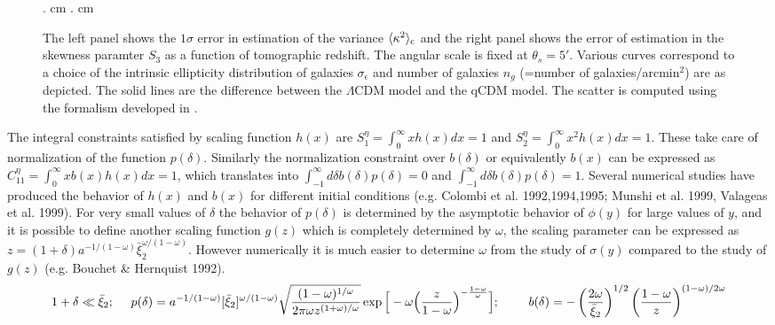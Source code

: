 \documentclass[usenatbib]{mn2e}
\def\la{\langle}
\def\ra{\rangle}
\begin{document}
\begin{figure}
\begin{center}
{. cm . cm
{}}
\end{center}
\caption{The left panel shows the $1\sigma$ error in estimation of the variance $\la\kappa^2\ra_{\rm c}$ and
the right panel shows the error of estimation in the skewness paramter $S_3$ as a function of tomographic redshift.  The angular scale
is fixed at $\theta_s=5'$. Various curves correspond to a choice of
the intrinsic ellipticity distribution of galaxies $\sigma_{\epsilon}$ 
and number of galaxies $n_{g}$ (=number of galaxies/arcmin$^2$) are as depicted. The solid lines are the difference between the $\Lambda$CDM model and the
qCDM model. The scatter is computed using the formalism developed in \citep{VaMuBa05}.}
\label{fig:sn_err}
\end{figure}
The integral constraints satisfied by scaling function $h(x)$ are
$ S^{\eta}_1 = \int_0^{\infty} x h(x) dx = 1$ and 
$ S^{\eta}_2 = \int_0^{\infty} x^2 h
(x) dx = 1$. These take care of  
normalization of the function $p(\delta)$. Similarly the 
normalization constraint over $b(\delta)$ or equivalently $b(x)$ can be expressed as
$C^{\eta}_{11} = \int_0^{\infty} x b(x)h(x)dx = 1$, which translates into
$\int_{-1}^{\infty} d\delta b(\delta)p(\delta) = 0$ and
$\int_{-1}^{\infty} d\delta b(\delta)p(\delta) = 1$.  
Several numerical
studies have produced the behavior of $h(x)$ and $b(x)$
for different initial conditions (e.g. Colombi et al. 1992,1994,1995; Munshi et
al. 1999, Valageas et al. 1999). For very small values of $\delta$ the behavior of
$p(\delta)$ is determined by the asymptotic behavior of $\phi(y)$ 
for large values of $y$, and it is possible to define another scaling function 
$g(z)$ which is completely determined by
$\omega$, the scaling parameter can be expressed as $z = (1+
\delta)a^{-1/(1-\omega)}{\bar \xi}_2^{\omega /(1 - \omega)}$. 
However numerically it is much easier to determine $\omega$ 
from the study of $\sigma(y)$ compared to the study of $g(z)$ 
(e.g. Bouchet \& Hernquist 1992).
\begin{equation}
1 + \delta \ll \bar \xi_2;~~~~
p(\delta) = a^{ -1/(1 - \omega)} [{\bar \xi}_2]^{ \omega/(1 -
\omega) } \sqrt { ( 1 - \omega )^{ 1/\omega } \over 2 \pi \omega z^{(1
+ \omega)/ \omega } } \exp \Big [ - \omega \Big ( {z \over 1 - \omega}
\Big )^{- {{1 - \omega} \over \omega}} \Big ]; ~~~~~~~b(\delta) = -
\left ( {2 \omega \over \bar{ \xi}_2} \right )^{1/2} \left ({ 1 -
\omega \over z}  \right )^{(1 - \omega)/2 \omega} 
\end{equation}
\end{document}
